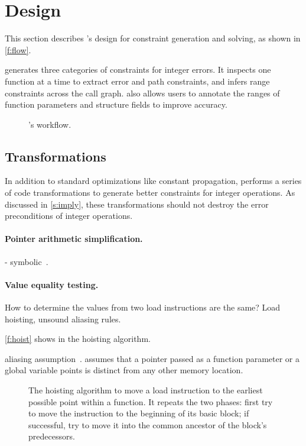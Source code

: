 \section{Design}
\label{s:gen}

This section describes \sys's design for constraint generation and
solving, as shown in \autoref{f:flow}.

\sys generates three categories of constraints for integer errors.
It inspects one function at a time to extract error and path
constraints, and infers range constraints across the call graph.
\sys also allows users to annotate the ranges of function parameters
and structure fields to improve accuracy.

\begin{figure}
\centering
\resizebox{0.9\linewidth}{!}{

}
\caption{\sys's workflow.}
\label{f:flow}
\end{figure}

\subsection{Transformations}

In addition to standard optimizations like constant propagation,
\sys performs a series of code transformations to generate better
constraints for integer operations.  As discussed in \autoref{s:imply},
these transformations should not destroy the error preconditions
of integer operations.

\paragraph{Pointer arithmetic simplification.}
- symbolic~\cite{engelen:symbolic}.

\paragraph{Value equality testing.}
How to determine the values from two load instructions
are the same? Load hoisting, unsound aliasing rules.

\autoref{f:hoist} shows in the hoisting algorithm.

aliasing assumption~\cite{livshits:ipssa}.
\sys assumes that a pointer passed as a function parameter or a
global variable points is distinct from any other memory location.


\begin{figure}

\caption{The hoisting algorithm to move a load instruction to the
earliest possible point within a function.  It repeats the two
phases: first try to move the instruction to the beginning of its
basic block; if successful, try to move it into the common ancestor
of the block's predecessors.}
\label{f:hoist}
\end{figure}

